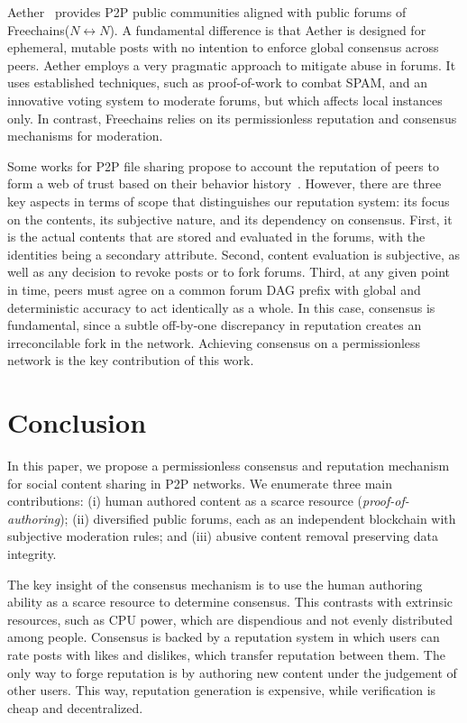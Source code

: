 \documentclass[12pt]{article}
\newcommand{\FC}       {Freechains\xspace}
\newcommand{\Xnn} {$N{\leftrightarrow}N$\xspace}
\begin{document}
Aether~\cite{p2p.ecosystem} provides P2P public communities aligned with public
forums of \FC (\Xnn).
A fundamental difference is that Aether is designed for ephemeral, mutable
posts with no intention to enforce global consensus across peers.
Aether employs a very pragmatic approach to mitigate abuse in forums.
It uses established techniques, such as proof-of-work to combat SPAM, and an
innovative voting system to moderate forums, but which affects local instances
only.
In contrast, \FC relies on its permissionless reputation and consensus
mechanisms for moderation.

Some works for P2P file sharing propose to account the reputation of peers to
form a web of trust based on their behavior
history~\cite{p2p.rep.wang,p2p.rep.eigentrust}.
However, there are three key aspects in terms of scope that distinguishes our
reputation system: its focus on the contents, its subjective nature, and its
dependency on consensus.
First, it is the actual contents that are stored and evaluated in the forums,
with the identities being a secondary attribute.
Second, content evaluation is subjective, as well as any decision to revoke
posts or to fork forums.
Third, at any given point in time, peers must agree on a common forum DAG
prefix with global and deterministic accuracy to act identically as a whole.
In this case, consensus is fundamental, since a subtle off-by-one discrepancy
in reputation creates an irreconcilable fork in the network.
Achieving consensus on a permissionless network is the key contribution of this
work.

\section{Conclusion}
\label{sec.conclusion}

In this paper, we propose a permissionless consensus and reputation mechanism
for social content sharing in P2P networks.
We enumerate three main contributions:
    (i)   human authored content as a scarce resource
          (\emph{proof-of-authoring});
    (ii)  diversified public forums, each as an independent blockchain with
          subjective moderation rules; and
    (iii) abusive content removal preserving data integrity.

The key insight of the consensus mechanism is to use the human authoring
ability as a scarce resource to determine consensus.
This contrasts with extrinsic resources, such as CPU power, which are
dispendious and not evenly distributed among people.
%
Consensus is backed by a reputation system in which users can rate posts with
likes and dislikes, which transfer reputation between them.
The only way to forge reputation is by authoring new content under the
judgement of other users.
This way, reputation generation is expensive, while verification is cheap and
decentralized.
\end{document}
